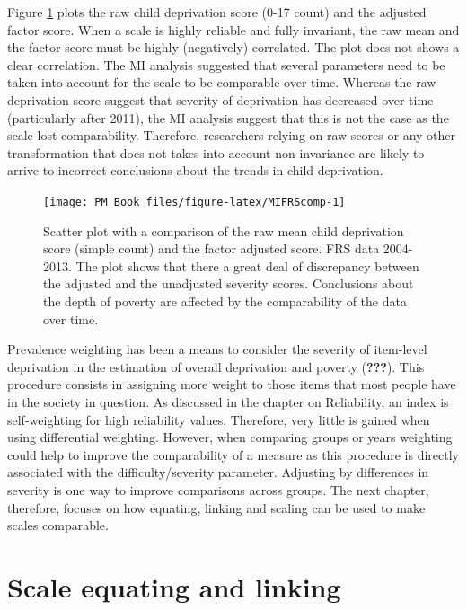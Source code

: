 \documentclass[]{book}
\begin{document}
Figure \ref{fig:MIFRScomp} plots the raw child deprivation score (0-17 count) and the adjusted factor score. When a scale is highly reliable and fully invariant, the raw mean and the factor score must be highly (negatively) correlated. The plot does not shows a clear correlation. The MI analysis suggested that several parameters need to be taken into account for the scale to be comparable over time. Whereas the raw deprivation score suggest that severity of deprivation has decreased over time (particularly after 2011), the MI analysis suggest that this is not the case as the scale lost comparability. Therefore, researchers relying on raw scores or any other transformation that does not takes into account non-invariance are likely to arrive to incorrect conclusions about the trends in child deprivation.

\begin{figure}[H]

{\centering \texttt{[image: PM\_Book\_files/figure-latex/MIFRScomp-1]} 

}

\caption{Scatter plot with a comparison of the raw mean child deprivation score (simple count) and the factor adjusted score. FRS data 2004-2013. The plot shows that there a great deal of discrepancy between the adjusted and the unadjusted severity scores. Conclusions about the depth of poverty are affected by the comparability of the data over time.}\label{fig:MIFRScomp}
\end{figure}

Prevalence weighting has been a means to consider the severity of item-level deprivation in the estimation of overall deprivation and poverty ({\textbf{???}}). This procedure consists in assigning more weight to those items that most people have in the society in question. As discussed in the chapter on Reliability, an index is self-weighting for high reliability values. Therefore, very little is gained when using differential weighting. However, when comparing groups or years weighting could help to improve the comparability of a measure as this procedure is directly associated with the difficulty/severity parameter. Adjusting by differences in severity is one way to improve comparisons across groups. The next chapter, therefore, focuses on how equating, linking and scaling can be used to make scales comparable.

\hypertarget{scale-equating-and-linking}{%
\chapter{Scale equating and linking}\label{scale-equating-and-linking}}
\end{document}
